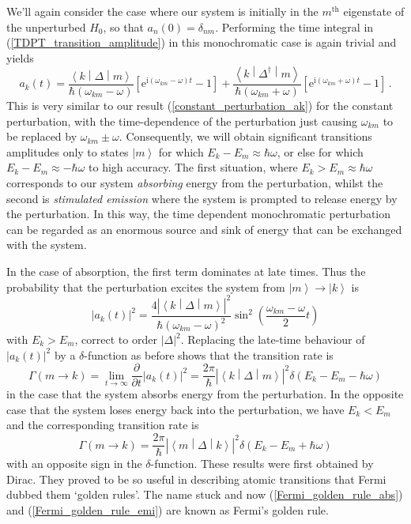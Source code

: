 \documentclass{article}
\theoremstyle{plain}\theoremheaderfont{\normalfont\itshape}\theorembodyfont{\rmfamily}\theoremseparator{.}\newtheorem*{rem}{Remark}\newtheorem*{ex}{Example}\newtheorem*{proof}{Proof}\newtheorem*{altp}{Alternative proof}
\theoremstyle{plain}\theoremheaderfont{\normalfont\bfseries}\theorembodyfont{\rmfamily}\theoremseparator{.}\newtheorem{thm}{Theorem}[section]\newtheorem{lem}[thm]{Lemma}\newtheorem{prop}[thm]{Proposition}\newtheorem*{cor}{Corollary}\newtheorem{defn}[thm]{Definition}\newtheorem{clm}[thm]{Claim}\newtheorem{clminproof}{Claim}
\theoremstyle{break}\theoremheaderfont{\normalfont\itshape}\theorembodyfont{\rmfamily}\theoremseparator{.\medskip}\newtheorem*{proofskip}{Proof}\newtheorem*{exs}{Examples}\newtheorem*{rems}{Remarks}
\theoremstyle{break}\theoremheaderfont{\normalfont\bfseries}\theorembodyfont{\rmfamily}\theoremseparator{.\medskip}\newtheorem{lemskip}[thm]{Lemma}\newtheorem{defnskip}[thm]{Definition}\newtheorem{propskip}[thm]{Proposition}\newtheorem{thmskip}[thm]{Theorem}
\numberwithin{equation}{section}
\newcommand{\ii}{\mathrm{i}}
\newcommand{\ee}{\mathrm{e}}
\newcommand{\pdv}[3][]{\frac{\partial^{#1} #2}{{\partial #3}^{#1}}}
\newcommand{\ket}[1]{\left| #1 \right\rangle}
\newcommand{\mel}[3]{\left\langle #1 \middle| #2 \middle| #3 \right\rangle}
\newcommand{\abs}[1]{\left| #1 \right|}
\begin{document}
    We'll again consider the case where our system is initially in the \(m^{\text{th}}\) eigenstate of the unperturbed \(H_0\), so that \(a_n(0)=\delta_{nm}\). Performing the time integral in (\ref{TDPT_transition_amplitude}) in this monochromatic case is again trivial and yields
    \begin{equation}
        a_k(t)=\frac{\mel{k}{\Delta}{m}}{\hbar(\omega_{km}-\omega)}\left[\ee^{\ii (\omega_{km}-\omega)t}-1\right]+\frac{\mel{k}{\Delta^\dagger}{m}}{\hbar(\omega_{km}+\omega)}\left[\ee^{\ii (\omega_{km}+\omega)t}-1\right]\,.
    \end{equation}
    This is very similar to our result (\ref{constant_perturbation_ak}) for the constant perturbation, with the time-dependence of the perturbation just causing \(\omega_{km}\) to be replaced by \(\omega_{km}\pm\omega\). Consequently, we will obtain significant transitions amplitudes only to states \(\ket{m}\) for which \(E_k-E_m\approx\hbar\omega\), or else for which \(E_k-E_m\approx-\hbar\omega\) to high accuracy. The first situation, where \(E_k>E_m\approx\hbar\omega\) corresponds to our system \textit{absorbing} energy from the perturbation, whilst the second is \textit{stimulated emission} where the system is prompted to release energy by the perturbation. In this way, the time dependent monochromatic perturbation can be regarded as an enormous source and sink of energy that can be exchanged with the system.

    In the case of absorption, the first term dominates at late times. Thus the probability that the perturbation excites the system from \(\ket{m}\to\ket{k}\) is
    \begin{equation}
        \abs{a_k(t)}^2=\frac{4\abs{\mel{k}{\Delta}{m}}^2}{\hbar(\omega_{km}-\omega)^2}\sin^2\left(\frac{\omega_{km}-\omega}{2}t\right)
    \end{equation}
    with \(E_k>E_m\), correct to order \(\abs{\Delta}^2\). Replacing the late-time behaviour of \(\abs{a_k(t)}^2\) by a \(\delta\)-function as before shows that the transition rate is
    \begin{equation}\label{Fermi_golden_rule_abs}
        \Gamma(m\to k)=\lim_{t\to\infty}\pdv{}{t}\abs{a_k(t)}^2=\frac{2\pi}{\hbar}\abs{\mel{k}{\Delta}{m}}^2\delta(E_k-E_m-\hbar\omega)
    \end{equation}
    in the case that the system absorbs energy from the perturbation. In the opposite case that the system loses energy back into the perturbation, we have \(E_k<E_m\) and the corresponding transition rate is
    \begin{equation}\label{Fermi_golden_rule_emi}
        \Gamma(m\to k)=\frac{2\pi}{\hbar}\abs{\mel{m}{\Delta}{k}}^2\delta(E_k-E_m+\hbar\omega)
    \end{equation}
    with an opposite sign in the \(\delta\)-function. These results were first obtained by Dirac. They proved to be so useful in describing atomic transitions that Fermi dubbed them `golden rules'. The name stuck and now (\ref{Fermi_golden_rule_abs}) and (\ref{Fermi_golden_rule_emi}) are known as Fermi's golden rule.
\end{document}
